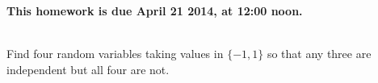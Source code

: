 \documentclass[]{article}
\newif\ifsolutions
\renewcommand{\answer}[1]{{\color{mydarkblue}\textbf{Solution:}#1}}
\begin{document}
\maketitle
{}
\vspace{0.5em}
{\Large{\textbf{This homework is due April 21 2014, at 12:00 noon.}}}

\begin{qunlist}

\\
Find four random variables taking values in $\{-1,1\}$ so that any three are independent but all four are not.

\ifsolutions{ \answer{
Let $X_1,X_2,X_3,X_4$ be i.i.d random variables with $P(X_i=1)=P(X_i=-1)=1/2$. Let $X_4=X_1X_2X_3$. Check that $X_1,X_2,X_3,X_4$ are four random variables such that any three are independent but all four are not. For example, they are not all independent because
\[
P(X_1=1,X_2=1,X_3=1,X_4=1)=1/8 \neq
P(X_1=1)P(X_2=1)P(X_3=1)P(X_4=1)
\]
}}
\fi
%
%
%
%
%


\end{qunlist}
\end{document}
